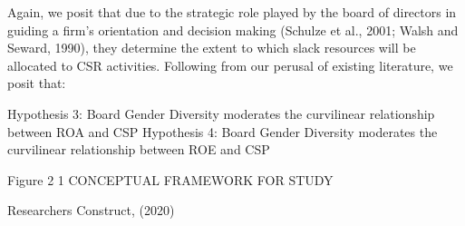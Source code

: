 \documentclass[
]{mitthesis}
\begin{document}
Again, we posit that due to the strategic role played by the board of directors in guiding a firm's orientation and decision making (Schulze et al., 2001; Walsh and Seward, 1990), they determine the extent to which slack resources will be allocated to CSR activities. Following from our perusal of existing literature, we posit that:

Hypothesis 3: Board Gender Diversity moderates the curvilinear relationship between ROA and CSP
Hypothesis 4: Board Gender Diversity moderates the curvilinear relationship between ROE and CSP

Figure 2 1 CONCEPTUAL FRAMEWORK FOR STUDY

Researchers Construct, (2020)
\end{document}
